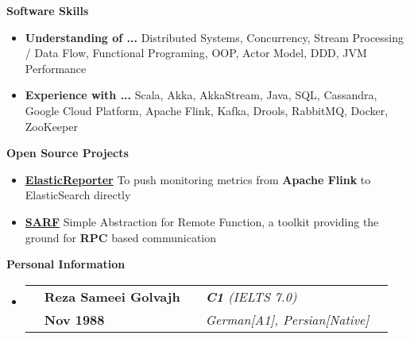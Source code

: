 \documentclass[letterpaper,12pt]{article}[leftmargin=*]
\makeatletter
\def \entryspacing {-0pt}
\renewcommand{\section}[2]{\vspace{5pt}
  \colorbox{secondary}{\color{white}\raggedbottom\normalsize\textbf{{#1}{\hspace{7pt}#2}}}
}
\newcommand{\resumeEntryStart}{\begin{itemize}[leftmargin=2.5mm]}
\newcommand{\resumeEntryEnd}{\end{itemize}\vspace{\entryspacing}}
\newcommand{\aboutMeEntryTSDL}[4]{
  \vspace{-1pt}\item[]
    \begin{tabular*}{0.97\textwidth}{l@{\extracolsep{\fill}}lrlr}
	  \color{primary}{Full name} & \textbf{\color{accent}#1} &
	  \color{primary}{English Fluency} & \textit{\color{accent}#3} \\
	  \color{primary}{Date of Birth} & \textbf{\color{accent}#2} &
	  \color{primary}{Other Languages} & \textit{\color{accent}#4} \\
    \end{tabular*}\vspace{-6pt}
}
\newcommand{\resumeEntryS}[2]{
  \item[]\small{
    \textbf{\color{primary}#1 }{ #2 \vspace{-6pt}}
  }
}
\makeatother
\begin{document}
\section{\faGears}{Software Skills}
	\resumeEntryStart
		\resumeEntryS{Understanding of ... } {Distributed Systems, Concurrency, Stream Processing / Data Flow, Functional Programing, OOP, Actor Model, DDD, JVM Performance}
		\resumeEntryS{Experience with ... } {Scala, Akka, AkkaStream, Java, SQL, Cassandra, Google Cloud Platform, Apache Flink, Kafka, Drools, RabbitMQ, Docker, ZooKeeper}
	\resumeEntryEnd

\section{\faGears}{Open Source Projects}
	\resumeEntryStart
		\resumeEntryS{\href{https://github.com/sameei/elasticreporter}{ElasticReporter}} {To push monitoring metrics from \textbf{Apache Flink} to ElasticSearch directly}
		\resumeEntryS{\href{https://github.com/sameei/SARF}{SARF}} {Simple Abstraction for Remote Function, a toolkit providing the ground for \textbf{RPC} based communication}
	\resumeEntryEnd
	

\section{}{Personal Information}
    \resumeEntryStart
      \aboutMeEntryTSDL
	  	{Reza Sameei Golvajh}{Nov 1988}{\textbf{C1} (IELTS 7.0)}{German[A1], Persian[Native]}
    \resumeEntryEnd
  
\end{document}
